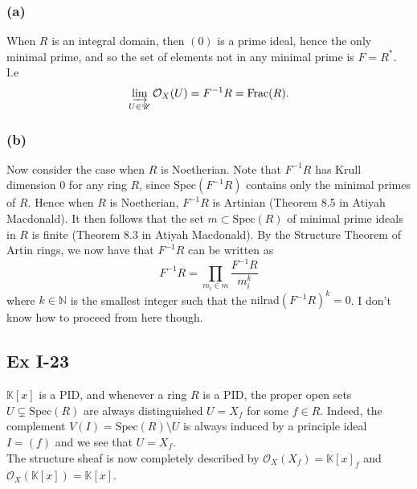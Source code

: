 \documentclass{article}
\theoremstyle{definition}
\newcommand{\K}{\mathbb{K}}
\newcommand{\N}{\mathbb{N}}
\newcommand{\Spec}{\text{Spec}}
\newcommand{\nilrad}{\text{nilrad}}
\newcommand{\Frac}{\text{Frac}}
\begin{document}
\subsubsection*{(a)}

When $R$ is an integral domain, then $(0)$ is a prime ideal, hence the only
minimal prime, and so the set of elements not in any minimal prime is $F =
R^*$. I.e
\[
	\varinjlim_{U \in \mathscr{U}}
	\mathcal{O}_X(U)
	=
	F^{-1}R
	=
	\Frac(R).
\] 

\subsubsection*{(b)}

Now consider the case when $R$ is Noetherian. Note that $F^{-1}R$ has Krull
dimension $0$ for any ring $R$, since $\Spec(F^{-1}R)$ contains only the
minimal primes of $R$. Hence when $R$ is Noetherian, $F^{-1}R$ is Artinian
(Theorem 8.5 in Atiyah Macdonald). It then follows that the set $m \subset
\Spec(R)$ of minimal prime ideals in $R$ is finite (Theorem 8.3 in Atiyah
Macdonald). By the Structure Theorem of Artin rings, we now have that $F^{-1}R$
can be written as 
\[
	F^{-1}R
	=
	\prod_{m_i \in m}
	\frac{F^{-1}R}{m_i^{k}}
\] 
where $k \in \N$ is the smallest integer such that the $\nilrad(F^{-1}R)^{k} =
0$. I don't know how to proceed from here though.

\subsection*{Ex I-23}

$\K[x]$ is a PID, and whenever a ring $R$ is a PID, the proper open sets $U
\subsetneq \Spec(R)$ are always distinguished $U = X_f$ for some $f \in R$.
Indeed, the complement $V(I) = \Spec(R) \setminus U$ is always induced by a
principle ideal $I = (f)$ and we see that $U = X_f$. \\

The structure sheaf is now completely described by $\mathcal{O}_X(X_f) =
\K[x]_f$ and $\mathcal{O}_X(\K[x]) = \K[x]$.
\end{document}
